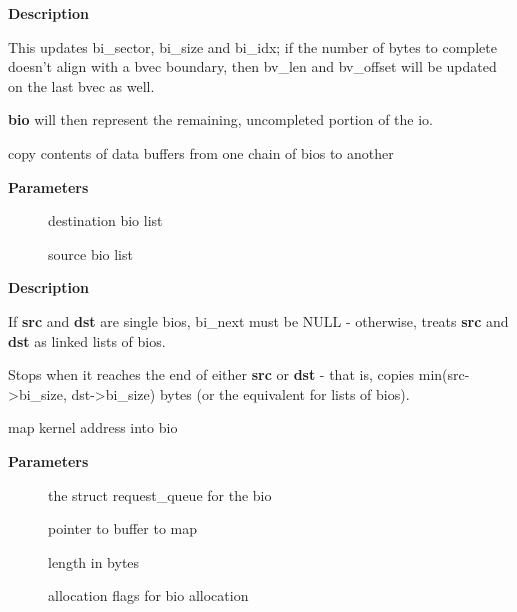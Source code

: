 \documentclass[a4paper,8pt,english]{sphinxmanual}
\begin{document}
\textbf{Description}

This updates bi\_sector, bi\_size and bi\_idx; if the number of bytes to
complete doesn't align with a bvec boundary, then bv\_len and bv\_offset will
be updated on the last bvec as well.

\textbf{bio} will then represent the remaining, uncompleted portion of the io.

\begin{fulllineitems}
\label{filesystems/index:c.bio_copy_data}
copy contents of data buffers from one chain of bios to another

\end{fulllineitems}


\textbf{Parameters}
\begin{description}
\item[{}] \leavevmode
destination bio list

\item[{}] \leavevmode
source bio list

\end{description}

\textbf{Description}

If \textbf{src} and \textbf{dst} are single bios, bi\_next must be NULL - otherwise, treats
\textbf{src} and \textbf{dst} as linked lists of bios.

Stops when it reaches the end of either \textbf{src} or \textbf{dst} - that is, copies
min(src-\textgreater{}bi\_size, dst-\textgreater{}bi\_size) bytes (or the equivalent for lists of bios).

\begin{fulllineitems}
\label{filesystems/index:c.bio_map_kern}
map kernel address into bio

\end{fulllineitems}


\textbf{Parameters}
\begin{description}
\item[{}] \leavevmode
the struct request\_queue for the bio

\item[{}] \leavevmode
pointer to buffer to map

\item[{}] \leavevmode
length in bytes

\item[{}] \leavevmode
allocation flags for bio allocation

\end{description}
\end{document}
